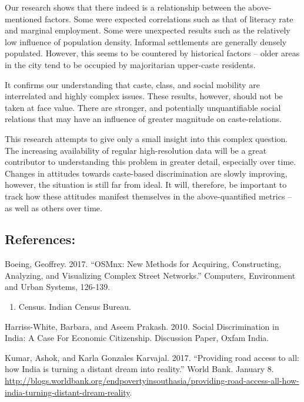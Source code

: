 \documentclass[
]{article}
\providecommand{\tightlist}{%
  \setlength{\itemsep}{0pt}\setlength{\parskip}{0pt}}
\begin{document}
Our research shows that there indeed is a relationship between the
above-mentioned factors. Some were expected correlations such as that of
literacy rate and marginal employment. Some were unexpected results such
as the relatively low influence of population density. Informal
settlements are generally densely populated. However, this seems to be
countered by historical factors -- older areas in the city tend to be
occupied by majoritarian upper-caste residents.

It confirms our understanding that caste, class, and social mobility are
interrelated and highly complex issues. These results, however, should
not be taken at face value. There are stronger, and potentially
unquantifiable social relations that may have an influence of greater
magnitude on caste-relations.

This research attempts to give only a small insight into this complex
question. The increasing availability of regular high-resolution data
will be a great contributor to understanding this problem in greater
detail, especially over time. Changes in attitudes towards caste-based
discrimination are slowly improving, however, the situation is still far
from ideal. It will, therefore, be important to track how these
attitudes manifest themselves in the above-quantified metrics -- as well
as others over time.

\hypertarget{references}{%
\subsection{References:}\label{references}}

Boeing, Geoffrey. 2017. ``OSMnx: New Methods for Acquiring,
Constructing, Analyzing, and Visualizing Complex Street Networks.''
Computers, Environment and Urban Systems, 126-139.

\begin{enumerate}
\def\labelenumi{\arabic{enumi}.}
\setcounter{enumi}{2010}
\tightlist
\item
  Census. Indian Census Bureau.
\end{enumerate}

Harriss-White, Barbara, and Aseem Prakash. 2010. Social Discrimination
in India: A Case For Economic Citizenship. Discussion Paper, Oxfam
India.

Kumar, Ashok, and Karla Gonzales Karvajal. 2017. ``Providing road access
to all: how India is turning a distant dream into reality.'' World Bank.
January 8.
\url{http://blogs.worldbank.org/endpovertyinsouthasia/providing-road-access-all-how-india-turning-distant-dream-reality}.
\end{document}
